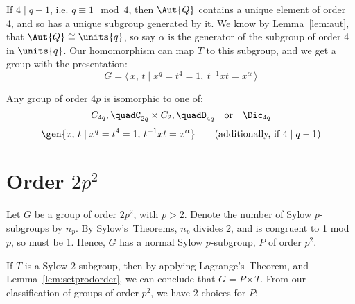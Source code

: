 \begin{enumerate}
        If \(4 \mid q-1\), i.e. \(q \equiv 1 \mod{4}\), then \(\Aut{Q}\) contains a unique element of order 4, and so
        has a unique subgroup generated by it.
        We know by Lemma~\ref{lem:aut}, that \(\Aut{Q} \cong \units{q}\), so say \(\alpha\) is the generator of the
        subgroup of order 4 in \(\units{q}\).
        Our homomorphism can map \(T\) to this subgroup, and we get a group with the presentation:
        \[G = \langle\, x,\,t \mid x^q = t^4 = 1,\ t^{-1}xt = x^{\alpha}\,\rangle\]
\end{enumerate}

\begin{mdframed}[align=center,nobreak=true]
    \begin{center}
        Any group of order \(4p\) is isomorphic to one of:
        \[%
            C_{4q}, \quad%
            C_{2q} \times C_2, \quad%
            D_{4q} \quad \text{or} \quad%
            \Dic_{4q}
        \]
        \[
            \gen{x,\, t \mid x^q = t^4 = 1,\, t^{-1}xt = x^\alpha} \tag{additionally, if \(4 \mid q-1\)}
        \]
    \end{center}
\end{mdframed}

\section{Order \(2p^2\)}
Let \(G\) be a group of order \(2p^2\), with \(p > 2\).
Denote the number of Sylow \(p\)-subgroups by \(n_p\).
By Sylow's~Theorems, \(n_p\) divides 2, and is congruent to 1 mod \(p\), so must be 1.
Hence, \(G\) has a normal Sylow \(p\)-subgroup, \(P\) of order \(p^2\).

If \(T\) is a Sylow 2-subgroup, then by applying Lagrange's~Theorem, and Lemma~\ref{lem:setprodorder}, we can conclude
that \(G = P \rtimes T\).
From our classification of groups of order \(p^2\), we have 2 choices for \(P\):

